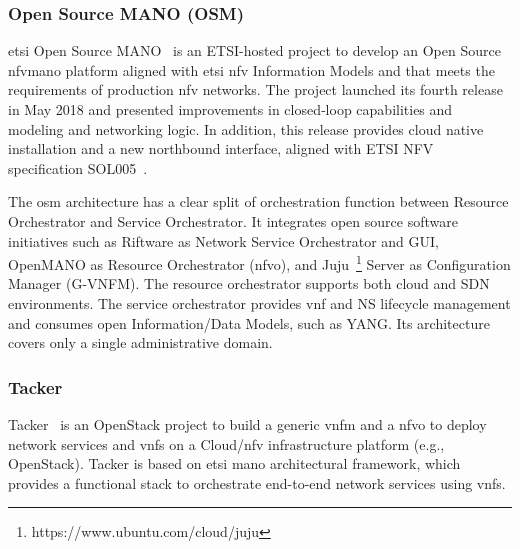 


\subsubsection{Open Source MANO (OSM)}
\gls{etsi} Open Source MANO~\cite{ETSIOpenMANO} is an ETSI-hosted project to develop an Open Source \gls{nfvmano} platform aligned with \gls{etsi} \gls{nfv} Information Models and that meets the requirements of production \gls{nfv} networks. The project launched its fourth release~\cite{Israel2017OSMOverviewb} in May 2018 and presented improvements in closed‐loop capabilities and modeling and networking logic. In addition, this release provides cloud native installation and a new northbound interface, aligned with ETSI NFV specification SOL005~\cite{ ETSIIndustrySpecificationGroupISGNFV2018NetworkNFV}. 

The \gls{osm} architecture has a clear split of orchestration function between Resource Orchestrator and Service Orchestrator. It integrates open source software initiatives such as Riftware as Network Service Orchestrator and GUI, OpenMANO as Resource Orchestrator (\gls{nfvo}), and Juju~\footnote{https://www.ubuntu.com/cloud/juju} Server as Configuration Manager (G-VNFM). The resource orchestrator supports both cloud and SDN environments. The service orchestrator provides \gls{vnf} and NS lifecycle management and consumes open Information/Data Models, such as YANG. Its architecture covers only a single administrative domain.  

\subsubsection{Tacker}
Tacker~\cite{OpenStackFoundation2016} is an OpenStack project to build a generic \gls{vnfm} and a \gls{nfvo} to deploy network services and \glspl{vnf} on a Cloud/\gls{nfv} infrastructure platform (e.g., OpenStack). Tacker is based on \gls{etsi} \gls{mano} architectural framework, which provides a functional stack to orchestrate end-to-end network services using \glspl{vnf}.

